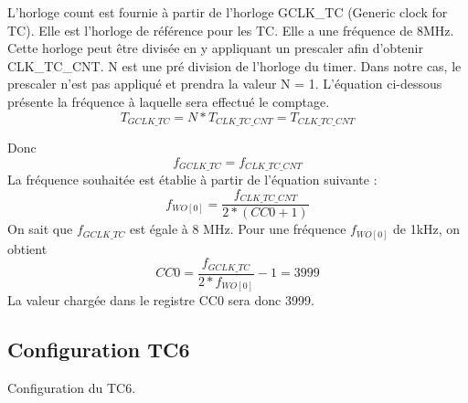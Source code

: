 \documentclass[a4paper]{article}
\begin{document}
L'horloge count est fournie à partir de l’horloge GCLK\_TC (Generic clock for TC). Elle est l'horloge de référence pour les TC. Elle a une fréquence de 8MHz. Cette horloge peut être divisée en y appliquant un prescaler afin d’obtenir CLK\_TC\_CNT. N est une pré division de l’horloge du timer. Dans notre cas, le prescaler n’est pas appliqué et prendra la valeur N = 1. L'équation ci-dessous présente la fréquence à laquelle sera effectué le comptage. \\
\begin{equation}
	T_{GCLK\_TC} = N*T_{CLK\_TC\_CNT} = T_{CLK\_TC\_CNT}
\end{equation}

Donc
\begin{equation}
	f_{GCLK\_TC} = f_{CLK\_TC\_CNT}
\end{equation}
La fréquence souhaitée est établie à partir de l'équation suivante :
\begin{equation}
	f_{WO[0]} = \frac{f_{CLK\_TC\_CNT}}{2*(CC0+1)}
\end{equation}
On sait que $f_{GCLK\_TC}$ est égale à 8 MHz. Pour une fréquence $f_{WO[0]}$ de 1kHz, on obtient\\
\begin{equation}
	CC0 = \frac{f_{GCLK\_TC}}{2*f_{WO[0]}} - 1 = 3999
\end{equation}
La valeur chargée dans le registre CC0 sera donc 3999.
\subsection{Configuration TC6}
Configuration du TC6.


\newpage

{}

\end{document}
